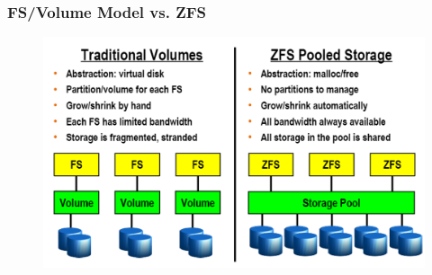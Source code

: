 % 
\begin{frame}[fragile]
    \frametitle{FS/Volume Model vs. ZFS}
    \begin{figure}
    \includegraphics[width=0.8\linewidth]{figs/ZFS-pooled-storage.png}
    \end{figure}
\end{frame}
% 
% 
% 
% 
